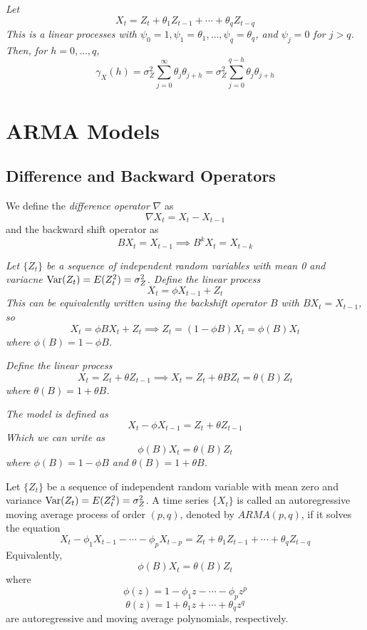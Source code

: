 \begin{example}[MA(q)]\label{ex:maq_acf}
    \emph{
        Let 
        \[X_t = Z_t + \theta_1Z_{t-1} + \cdots + \theta_qZ_{t-q}\]
        This is a linear processes with $\psi_0 = 1, \psi_1 = \theta_1, \dots, \psi_q = \theta_q$, and $\psi_j = 0$ for $j > q$. Then, for $h = 0, \ldots, q$, 
        \[\gamma_X(h) = \sigma_Z^2\sum_{j=0}^\infty \theta_j\theta_{j+h} = \sigma_Z^2\sum_{j=0}^{q-h}\theta_j\theta_{j+h}\]
    }
\end{example}

\section{ARMA Models}

\subsection{Difference and Backward Operators}

We define the \emph{difference operator} $\nabla$ as 
\[\nabla X_t = X_t - X_{t-1}\]
and the backward shift operator as 
\[BX_t = X_{t-1} \implies B^kX_t = X_{t-k}\]

\begin{example}[AR(1)]
    \emph{
        Let $\{Z_t\}$ be a sequence of independent random variables with mean 0 and variacne $\operatorname{Var}(Z_t) = E(Z_t^2) = \sigma_Z^2$. Define the linear process
        \[X_t = \phi X_{t-1} + Z_t\]
        This can be equivalently written using the backshift operator $B$ with $BX_t = X_{t-1}$, so 
        \[X_t = \phi BX_t + Z_t \implies Z_t = (1-\phi B)X_t = \phi(B)X_t \]
        where $\phi(B) = 1 - \phi B$. 
    }
\end{example}

\begin{example}[MA(1)]
    \emph{
        Define the linear process
        \[X_t = Z_t + \theta Z_{t-1} \implies X_t = Z_t + \theta B Z_t = \theta(B)Z_t\]
        where $\theta(B) = 1 + \theta B$.
    }
\end{example}

\begin{example}[ARMA(1,1)]
    \emph{    
        The model is defined as 
        \[X_t - \phi X_{t-1} = Z_t + \theta Z_{t-1}\]
        Which we can write as
        \[\phi(B)X_t = \theta(B)Z_t\]
        where $\phi(B) = 1 - \phi B$ and $\theta(B) = 1 + \theta B$.
    }
\end{example}

\begin{definition}
    Let $\{Z_t\}$ be a sequence of independent random variable with mean zero and variance $\operatorname{Var}(Z_t) = E(Z_t^2) = \sigma_Z^2$. A time series $\{X_t\}$ is called an autoregressive moving average process of order $(p,q)$, denoted by $ARMA(p,q)$, if it solves the equation 
    \[X_t - \phi_1X_{t-1} - \cdots - \phi_pX_{t-p} = Z_t + \theta_1Z_{t-1} + \cdots + \theta_qZ_{t-q}\]
    Equivalently, 
    \[\phi(B)X_t = \theta(B)Z_t\]
    where 
    \[\phi(z) = 1 - \phi_1z - \cdots - \phi_pz^p\]
    \[\theta(z) = 1 + \theta_1z + \cdots + \theta_qz^q\]
    are autoregressive and moving average polynomials, respectively.
\end{definition}

